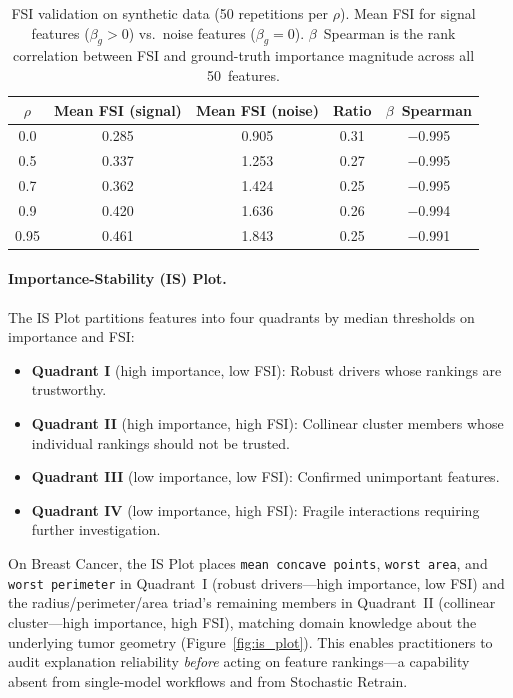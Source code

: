 \documentclass[11pt]{article}
\newcommand{\rhovar}{\rho}
\begin{document}
\begin{table}[htbp]
\centering
\caption{FSI validation on synthetic data (50 repetitions per $\rhovar$).
Mean FSI for signal features ($\beta_g > 0$) vs.\ noise features
($\beta_g = 0$).  $\beta$~Spearman is the rank correlation between FSI
and ground-truth importance magnitude across all 50~features.}
\label{tab:fsi_validation}
\small
\begin{tabular}{ccccc}
\toprule
$\rhovar$ & Mean FSI (signal) & Mean FSI (noise) & Ratio & $\beta$~Spearman \\
\midrule
0.0  & 0.285 & 0.905 & 0.31 & $-$0.995 \\
0.5  & 0.337 & 1.253 & 0.27 & $-$0.995 \\
0.7  & 0.362 & 1.424 & 0.25 & $-$0.995 \\
0.9  & 0.420 & 1.636 & 0.26 & $-$0.994 \\
0.95 & 0.461 & 1.843 & 0.25 & $-$0.991 \\
\bottomrule
\end{tabular}
\end{table}

\paragraph{Importance-Stability (IS) Plot.}
The IS Plot partitions features into four quadrants by median
thresholds on importance and FSI:
\begin{itemize}
  \item \textbf{Quadrant I} (high importance, low FSI): Robust
    drivers whose rankings are trustworthy.
  \item \textbf{Quadrant II} (high importance, high FSI): Collinear
    cluster members whose individual rankings should not be trusted.
  \item \textbf{Quadrant III} (low importance, low FSI): Confirmed
    unimportant features.
  \item \textbf{Quadrant IV} (low importance, high FSI): Fragile
    interactions requiring further investigation.
\end{itemize}

On Breast Cancer, the IS Plot places \texttt{mean concave points},
\texttt{worst area}, and \texttt{worst perimeter} in Quadrant~I
(robust drivers---high importance, low FSI) and the
radius/perimeter/area triad's remaining members in Quadrant~II
(collinear cluster---high importance, high FSI), matching
domain knowledge about the underlying tumor geometry
(Figure~\ref{fig:is_plot}). This enables practitioners to audit
explanation reliability \emph{before} acting on feature rankings---a
capability absent from single-model workflows and from Stochastic
Retrain.
\end{document}
